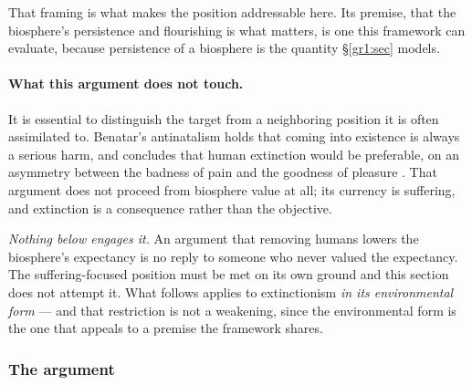 \documentclass[11pt]{article}
\numberwithin{equation}{section}
\theoremstyle{plain}
\theoremstyle{definition}
\theoremstyle{remark}
\begin{document}
That framing is what makes the position addressable here. Its premise, that the biosphere's persistence and flourishing is what matters, is one this framework can evaluate, because persistence of a biosphere
is the quantity \S\ref{gr1:sec} models.

\paragraph{What this argument does not touch.}\label{hr:rem:scope}
It is essential to distinguish the target from a neighboring position
it is often assimilated to. Benatar's antinatalism holds that coming
into existence is always a serious harm, and concludes that human
extinction would be preferable, on an asymmetry between the badness of
pain and the goodness of pleasure \cite{Benatar06}. That argument does
not proceed from biosphere value at all; its currency is suffering, and
extinction is a consequence rather than the objective.

\emph{Nothing below engages it.} An argument that removing humans lowers
the biosphere's expectancy is no reply to someone who never valued the
expectancy. The suffering-focused position must be met on its own ground
and this section does not attempt it. What follows applies to
extinctionism \emph{in its environmental form} --- and that restriction
is not a weakening, since the environmental form is the one that appeals
to a premise the framework shares.

\subsubsection{The argument}\label{hr:subsub:extinctionargument}
\end{document}
